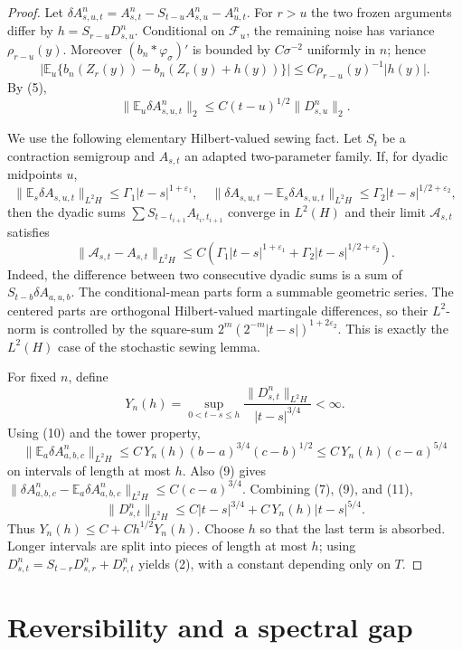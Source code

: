 \documentclass[12pt]{article}
\newcommand{\E}{\mathbb E}
\newcommand{\1}{\mathbf 1}
\newcommand{\calF}{\mathcal F}
\begin{document}
\begin{proof}
Let
\(\delta A^n_{s,u,t}=A^n_{s,t}-S_{t-u}A^n_{s,u}-A^n_{u,t}\).  For
\(r>u\) the two frozen arguments differ by \(h=S_{r-u}D^n_{s,u}\).  Conditional
on \(\calF_u\), the remaining noise has variance \(\rho_{r-u}(y)\).  Moreover
\((b_n*\varphi_\sigma)'\) is bounded by \(C\sigma^{-2}\) uniformly in \(n\);
hence
\[
 \left|\E_u\{b_n(Z_r(y))-b_n(Z_r(y)+h(y))\}\right|
      \le C\rho_{r-u}(y)^{-1}|h(y)|.
\]
By (5),
\[
        \|\E_u\delta A^n_{s,u,t}\|_2
        \le C(t-u)^{1/2}\|D^n_{s,u}\|_2 .                    \tag{10}
\]

We use the following elementary Hilbert-valued sewing fact.  Let \(S_t\) be a
contraction semigroup and \(A_{s,t}\) an adapted two-parameter family.  If, for
dyadic midpoints \(u\),
\[
\|\E_s\delta A_{s,u,t}\|_{L^2H}\le \Gamma_1|t-s|^{1+\varepsilon_1},\quad
\|\delta A_{s,u,t}-\E_s\delta A_{s,u,t}\|_{L^2H}
        \le \Gamma_2|t-s|^{1/2+\varepsilon_2},
\]
then the dyadic sums \(\sum S_{t-t_{i+1}}A_{t_i,t_{i+1}}\) converge in
\(L^2(H)\) and their limit \({\mathcal A}_{s,t}\) satisfies
\[
 \|{\mathcal A}_{s,t}-A_{s,t}\|_{L^2H}
 \le C(\Gamma_1|t-s|^{1+\varepsilon_1}
       +\Gamma_2|t-s|^{1/2+\varepsilon_2}).                  \tag{11}
\]
Indeed, the difference between two consecutive dyadic sums is a sum of
\(S_{t-b}\delta A_{a,u,b}\).  The conditional-mean parts form a summable
geometric series.  The centered parts are orthogonal Hilbert-valued martingale
differences, so their \(L^2\)-norm is controlled by the square-sum
\(2^m(2^{-m}|t-s|)^{1+2\varepsilon_2}\).  This is exactly the
\(L^2(H)\) case of the stochastic sewing lemma.

For fixed \(n\), define
\[
Y_n(h)=\sup_{0<t-s\le h}
       \frac{\|D^n_{s,t}\|_{L^2H}}{|t-s|^{3/4}}<\infty .
\]
Using (10) and the tower property,
\[
 \|\E_a\delta A^n_{a,b,c}\|_{L^2H}
 \le C\,Y_n(h)(b-a)^{3/4}(c-b)^{1/2}
 \le C\,Y_n(h)(c-a)^{5/4}
\]
on intervals of length at most \(h\).  Also (9) gives
\(\|\delta A^n_{a,b,c}-\E_a\delta A^n_{a,b,c}\|_{L^2H}\le C(c-a)^{3/4}\).
Combining (7), (9), and (11),
\[
 \|D^n_{s,t}\|_{L^2H}
 \le C|t-s|^{3/4}+C\,Y_n(h)|t-s|^{5/4}.
\]
Thus \(Y_n(h)\le C+Ch^{1/2}Y_n(h)\).  Choose \(h\) so that the last term is
absorbed.  Longer intervals are split into pieces of length at most \(h\);
using \(D^n_{s,t}=S_{t-r}D^n_{s,r}+D^n_{r,t}\) yields (2), with a constant
depending only on \(T\).
\end{proof}

\section*{Reversibility and a spectral gap}
\end{document}
